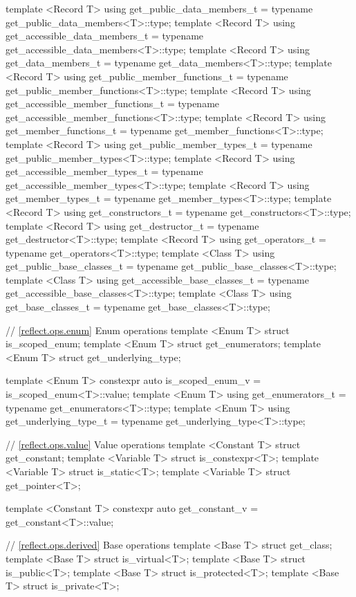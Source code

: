 \begin{std.txt}
\begin{codeblock}
{{template <Record T>
  using get_public_data_members_t = typename get_public_data_members<T>::type;
template <Record T>
  using get_accessible_data_members_t = typename get_accessible_data_members<T>::type;
template <Record T>
  using get_data_members_t = typename get_data_members<T>::type;
template <Record T>
  using get_public_member_functions_t = typename get_public_member_functions<T>::type;
template <Record T>
  using get_accessible_member_functions_t = typename get_accessible_member_functions<T>::type;
template <Record T>
  using get_member_functions_t = typename get_member_functions<T>::type;
template <Record T>
  using get_public_member_types_t = typename get_public_member_types<T>::type;
template <Record T>
  using get_accessible_member_types_t = typename get_accessible_member_types<T>::type;
template <Record T>
  using get_member_types_t = typename get_member_types<T>::type;
template <Record T>
  using get_constructors_t = typename get_constructors<T>::type;
template <Record T>
  using get_destructor_t = typename get_destructor<T>::type;
template <Record T>
  using get_operators_t = typename get_operators<T>::type;
template <Class T>
  using get_public_base_classes_t = typename get_public_base_classes<T>::type;
template <Class T>
  using get_accessible_base_classes_t = typename get_accessible_base_classes<T>::type;
template <Class T>
  using get_base_classes_t = typename get_base_classes<T>::type;

// \ref{reflect.ops.enum} Enum operations
template <Enum T> struct is_scoped_enum;
template <Enum T> struct get_enumerators;
template <Enum T> struct get_underlying_type;

template <Enum T>
  constexpr auto is_scoped_enum_v = is_scoped_enum<T>::value;
template <Enum T>
  using get_enumerators_t = typename get_enumerators<T>::type;
template <Enum T>
  using get_underlying_type_t = typename get_underlying_type<T>::type;

// \ref{reflect.ops.value} Value operations
template <Constant T> struct get_constant;
template <Variable T> struct is_constexpr<T>;
template <Variable T> struct is_static<T>;
template <Variable T> struct get_pointer<T>;

template <Constant T>
  constexpr auto get_constant_v = get_constant<T>::value;

// \ref{reflect.ops.derived} Base operations
template <Base T> struct get_class;
template <Base T> struct is_virtual<T>;
template <Base T> struct is_public<T>;
template <Base T> struct is_protected<T>;
template <Base T> struct is_private<T>;

}}
\end{codeblock}
\end{std.txt}
